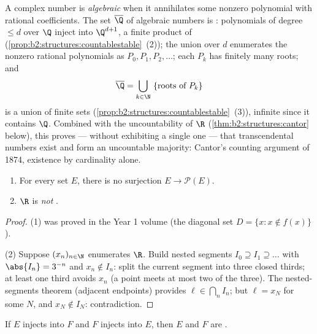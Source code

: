 \begin{example}\label{ex:b2:structures:algebraic}
A complex number is \emph{algebraic} when it annihilates some
nonzero polynomial with rational coefficients. The set
$\overline\Q$ of algebraic numbers is : polynomials of
degree $\leq d$ over $\Q$ inject into $\Q^{d+1}$, a finite
product of 
(\cref{prop:b2:structures:countablestable}~(2)); the union over
$d$ enumerates the nonzero rational polynomials as $P_0, P_1,
P_2, \dots$; each $P_k$ has finitely many roots; and
\[
\overline\Q = \bigcup_{k \in \N}\ \{\text{roots of } P_k\}
\]
is a  union of finite sets
(\cref{prop:b2:structures:countablestable}~(3)), infinite since
it contains $\Q$. Combined with the uncountability of $\R$
(\cref{thm:b2:structures:cantor} below), this proves --- without
exhibiting a single one --- that transcendental numbers exist
and form an uncountable majority: Cantor's counting argument of
1874, existence by cardinality alone.
\end{example}

\begin{theorem}\label{thm:b2:structures:cantor}
\begin{enumerate}
  \item For every set $E$, there is no surjection $E \to
        \mathcal{P}(E)$.
  \item $\R$ is \emph{not} .
\end{enumerate}
\end{theorem}

\begin{proof}
(1) was proved in the Year 1 volume (the diagonal set $D = \{x : x
\notin f(x)\}$).

(2) Suppose $(x_n)_{n \in \N}$ enumerates $\R$. Build nested segments
$I_0 \supseteq I_1 \supseteq \dots$ with $\abs{I_n} = 3^{-n}$ and
$x_n \notin I_n$: split the current segment into three closed thirds;
at least one third avoids $x_n$ (a point meets at most two of the
three). The nested-segments theorem (adjacent endpoints) provides
$\ell \in \bigcap_n I_n$; but $\ell = x_N$ for some $N$, and $x_N
\notin I_N$: contradiction.
\end{proof}

\begin{theorem}\label{thm:b2:structures:cantorbernstein}
If $E$ injects into $F$ and $F$ injects into $E$, then $E$ and $F$
are .
\end{theorem}

